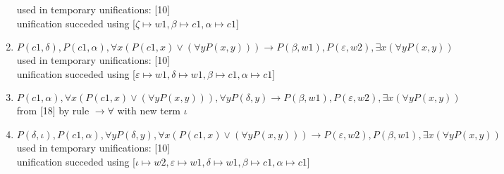 \begin{enumerate}
  used in temporary unifications: [10]\\ 
 unification succeded using [$\zeta \mapsto w1, \beta \mapsto c1, \alpha \mapsto c1$]
\item $P(c1, \delta), P(c1, \alpha),  \forall  x (P(c1, x)  \vee  ( \forall  y P(x, y))) \rightarrow  P(\beta, w1), P(\varepsilon, w2),  \exists  x ( \forall  y P(x, y))$\\
  used in temporary unifications: [10]\\ 
 unification succeded using [$\varepsilon \mapsto w1, \delta \mapsto w1, \beta \mapsto c1, \alpha \mapsto c1$]
\item $P(c1, \alpha),  \forall  x (P(c1, x)  \vee  ( \forall  y P(x, y))),  \forall  y P(\delta, y) \rightarrow  P(\beta, w1), P(\varepsilon, w2),  \exists  x ( \forall  y P(x, y))$\\
 from [18] by rule $\rightarrow \forall $ with new term $\iota$
\item $P(\delta, \iota), P(c1, \alpha),  \forall  y P(\delta, y),  \forall  x (P(c1, x)  \vee  ( \forall  y P(x, y))) \rightarrow  P(\varepsilon, w2), P(\beta, w1),  \exists  x ( \forall  y P(x, y))$\\
  used in temporary unifications: [10]\\ 
 unification succeded using [$\iota \mapsto w2, \varepsilon \mapsto w1, \delta \mapsto w1, \beta \mapsto c1, \alpha \mapsto c1$]
\end{enumerate}
